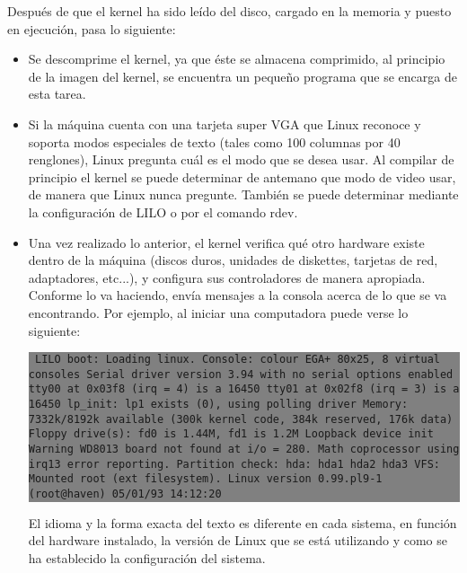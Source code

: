 \documentclass[12pt]{article}
\begin{document}
 Después de que el kernel ha sido leído del disco, cargado en la memoria y
puesto en ejecución, pasa lo siguiente: \begin{itemize}

	\item{

Se descomprime el kernel, ya que éste se almacena comprimido, al principio de la
imagen del kernel, se encuentra un pequeño programa que se encarga de esta
tarea.  }

	\item{

Si la máquina cuenta con una tarjeta super VGA que Linux reconoce y soporta
modos especiales de texto (tales como 100 columnas por 40 renglones), Linux
pregunta cuál es el modo que se desea usar. Al compilar de principio el kernel
se puede determinar de antemano que modo de video usar, de manera que Linux
nunca pregunte. También se puede determinar mediante la configuración de LILO o
por el comando rdev.  }

	\item{

Una vez realizado lo anterior, el kernel verifica qué otro hardware existe
dentro de la máquina (discos duros, unidades de diskettes, tarjetas de red,
adaptadores, etc...), y configura sus controladores de manera apropiada.
Conforme lo va haciendo, envía mensajes a la consola acerca de lo que se va
encontrando. Por ejemplo, al iniciar una computadora puede verse lo siguiente:

  
   


\colorbox{grey}{\parbox[t]{0.95\linewidth}{ \vspace*{0.5cm} {\tt 
LILO boot:
Loading linux.
Console: colour EGA+ 80x25, 8 virtual consoles
Serial driver version 3.94 with no serial options enabled
tty00 at 0x03f8 (irq = 4) is a 16450
tty01 at 0x02f8 (irq = 3) is a 16450
lp\_init: lp1 exists (0), using polling driver
Memory: 7332k/8192k available (300k kernel code, 384k reserved, 176k
data)
Floppy drive(s): fd0 is 1.44M, fd1 is 1.2M
Loopback device init
Warning WD8013 board not found at i/o = 280.
Math coprocessor using irq13 error reporting.
Partition check:
  hda: hda1 hda2 hda3
VFS: Mounted root (ext filesystem).
Linux version 0.99.pl9-1 (root@haven) 05/01/93 14:12:20
 } \vspace*{0.5cm} } } 




El idioma y la forma exacta del texto es diferente en cada sistema, en función
del hardware instalado, la versión de Linux que se está utilizando y como se ha
establecido la configuración del sistema.  }


\end{itemize}
\end{document}
